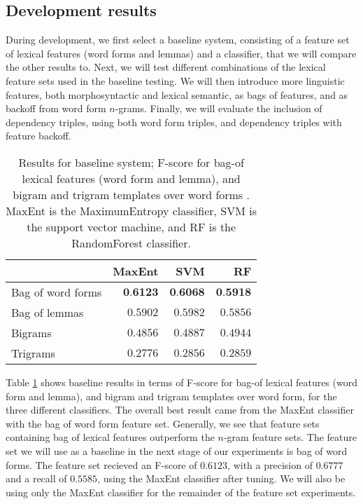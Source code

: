 \documentclass[11pt,letterpaper]{article}
\begin{document}
\subsection{Development results}

During development, we first select a baseline system, consisting of a feature set of lexical features (word forms and lemmas) and a classifier, that we will compare the other results to. Next, we will test different combinations of the lexical feature sets used in the baseline testing. We will then introduce more linguistic features, both morphosyntactic and lexical semantic, as bags of features, and as backoff from word form $n$-grams. Finally, we will evaluate the inclusion of dependency triples, using both word form triples, and dependency triples with feature backoff.

\begin{table}
  \begin{center}
    \begin{tabular}{lrrr}
      \toprule

      & MaxEnt & SVM & RF \\
      \midrule
      Bag of word forms & $\textbf{0.6123}$ & $\textbf{0.6068}$ & $\textbf{0.5918}$ \\ %
      Bag of lemmas & $0.5902$ & $0.5982$ & $0.5856$ \\
      Bigrams & $0.4856$ & $0.4887$ & $0.4944$ \\
      Trigrams & $0.2776$ & $0.2856$ & $0.2859$ \\
      
      
      \bottomrule
    \end{tabular}
  \end{center}
  \caption{Results for baseline system; F-score for bag-of lexical features (word form and lemma), and bigram and trigram templates over word forms . MaxEnt is the MaximumEntropy classifier, SVM is the support vector machine, and RF is the RandomForest classifier.}
  \label{tab:baseline}
\end{table}

Table \ref{tab:baseline} shows baseline results in terms of F-score for bag-of lexical features (word form and lemma), and bigram and trigram templates over word form, for the three different classifiers. The overall best result came from the MaxEnt classifier with the bag of word form feature set. Generally, we see that feature sets containing bag of lexical features outperform the $n$-gram feature sets. The feature set we will use as a baseline in the next stage of our experiments is bag of word forms. The feature set recieved an F-score of $0.6123$, with a precision of $0.6777$ and a recall of $0.5585$, using the MaxEnt classifier after tuning. We will also be using only the MaxEnt classifier for the remainder of the feature set experiments.
\end{document}
